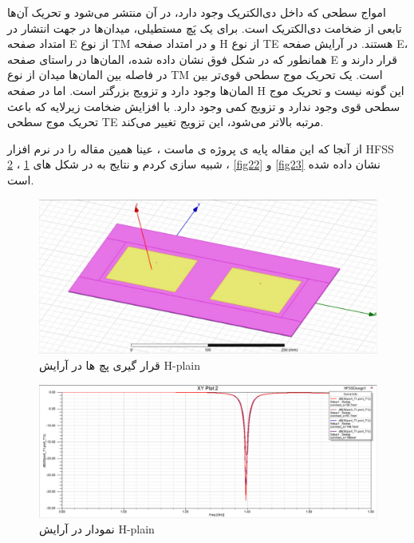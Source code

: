 امواج سطحی که داخل دی‌الکتریک وجود دارد، در آن منتشر می‌شود و تحریک آن‌ها تابعی از ضخامت دی‌الکتریک است. برای یک پَچ مستطیلی، میدان‌ها در جهت انتشار در امتداد صفحه E از نوع TM و در امتداد صفحه H از نوع TE هستند. در آرایش صفحه E، همانطور که در شکل فوق نشان داده شده، المان‌ها در راستای صفحه E قرار دارند و در فاصله بین المان‌ها میدان از نوع TM است. یک تحریک موج سطحی قوی‌تر بین المان‌ها وجود دارد و تزویج بزرگتر است. اما در صفحه H این گونه نیست و تحریک موج سطحی قوی وجود ندارد و تزویج کمی وجود دارد. با افزایش ضخامت زیرلایه که باعث تحریک موج سطحی TE مرتبه بالاتر می‌شود، این تزویج تغییر می‌کند.



از آنجا که این مقاله پایه ی پروژه ی ماست ، عینا همین مقاله را در نرم افزار HFSS شبیه سازی کردم و نتایج به در شکل های 
\ref{fig20}
،
\ref{fig21}
،
\ref{fig22}
و
\ref{fig23}
نشان داده شده است.

 

\begin{figure}
	\includegraphics[scale=0.5]{Images/fig20.jpg}
	\caption{قرار گیری پچ ها در آرایش H-plain}
	\label{fig20}
\end{figure}
\begin{figure}
	\includegraphics[scale=0.5]{Images/fig21.jpg}
	\caption{نمودار  در آرایش H-plain }
	\label{fig21}
\end{figure}

